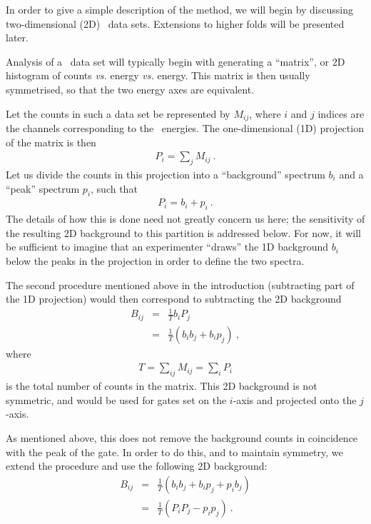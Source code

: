 In order to give a simple description of the method, we will begin by
discussing two-dimensional (2D) \ghg\ data sets. Extensions to higher folds
will be presented later.

Analysis of a \ghg\ data set will typically begin with generating a ``matrix'',
or 2D histogram of counts {\em vs.} energy {\em vs.} energy. This
matrix is then usually symmetrised, so that the two energy axes are equivalent.

Let the counts in such a data set be represented by $M_{ij}$, where $i$ and
$j$ indices are the channels corresponding to the \ghray\ energies. The
one-dimensional (1D) projection of the matrix is then
\begin{eqnarray*}
P_i  = \sum_j M_{ij} \ .
\end{eqnarray*}
Let us divide the counts in this projection into a ``background'' spectrum
$b_i$ and a ``peak'' spectrum $p_i$, such that
\begin{eqnarray*}
P_i  = b_i + p_i \ .
\end{eqnarray*}
The details of how this is done need not greatly concern us here; the
sensitivity of the resulting 2D background to this partition is addressed
below. For now, it will be sufficient to imagine that an experimenter ``draws''
the 1D background $b_i$ below the peaks in the projection in order to define
the two spectra.

The second procedure mentioned above in the introduction (subtracting part of
the 1D projection) would then correspond to subtracting the 2D background
\begin{eqnarray}
B_{ij} & = & \frac {1}{T} b_i P_j                          \nonumber \\
       & = & \frac {1}{T} (b_i b_j + b_i p_j) \ ,          \label{eq:m0} 
\end{eqnarray}
where
\begin{eqnarray}
T  =  \sum_{ij} M_{ij}  =  \sum_i P_i                      \label{eq:m0b} 
\end{eqnarray}
is the total number of counts in the matrix. This 2D background is not
symmetric, and would be used for gates set on the $i$-axis and projected onto
the $j$-axis.

As mentioned above, this does not remove the background counts in coincidence
with the peak of the gate. In order to do this, and to maintain symmetry,
we extend the procedure and use the following 2D background:
\begin{eqnarray}
B_{ij} & = & \frac {1}{T} (b_i b_j + b_i p_j + p_i b_j)    \nonumber \\
       & = & \frac {1}{T} (P_i P_j - p_i p_j) \ .          \label{eq:m1} 
\end{eqnarray}

